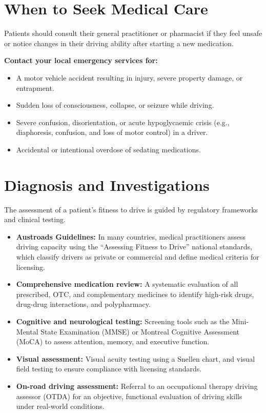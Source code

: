 \section*{When to Seek Medical Care}
Patients should consult their general practitioner or pharmacist if they feel unsafe or notice changes in their driving ability after starting a new medication.

\textbf{Contact your local emergency services for:}
\begin{itemize}
    \item A motor vehicle accident resulting in injury, severe property damage, or entrapment.
    \item Sudden loss of consciousness, collapse, or seizure while driving.
    \item Severe confusion, disorientation, or acute hypoglycaemic crisis (e.g., diaphoresis, confusion, and loss of motor control) in a driver.
    \item Accidental or intentional overdose of sedating medications.
\end{itemize}

\section*{Diagnosis and Investigations}
The assessment of a patient's fitness to drive is guided by regulatory frameworks and clinical testing.
\begin{itemize}
    \item \textbf{Austroads Guidelines:} In many countries, medical practitioners assess driving capacity using the ``Assessing Fitness to Drive'' national standards, which classify drivers as private or commercial and define medical criteria for licensing.
    \item \textbf{Comprehensive medication review:} A systematic evaluation of all prescribed, OTC, and complementary medicines to identify high-risk drugs, drug-drug interactions, and polypharmacy.
    \item \textbf{Cognitive and neurological testing:} Screening tools such as the Mini-Mental State Examination (MMSE) or Montreal Cognitive Assessment (MoCA) to assess attention, memory, and executive function.
    \item \textbf{Visual assessment:} Visual acuity testing using a Snellen chart, and visual field testing to ensure compliance with licensing standards.
    \item \textbf{On-road driving assessment:} Referral to an occupational therapy driving assessor (OTDA) for an objective, functional evaluation of driving skills under real-world conditions.
\end{itemize}

